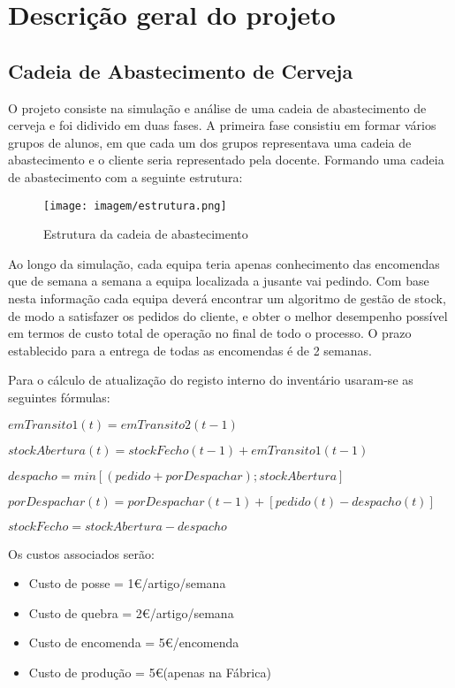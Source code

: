 \chapter{Descrição geral do projeto}
\section{Cadeia de Abastecimento de Cerveja}


O projeto consiste na simulação e análise de uma cadeia de abastecimento de cerveja e foi didivido em duas fases. A primeira fase consistiu em formar vários grupos de alunos, em que cada um dos grupos representava uma cadeia de abastecimento e o cliente seria representado pela docente. Formando uma cadeia de abastecimento com a seguinte estrutura: 

\begin{figure}[tbph]
	\centering
	\texttt{[image: imagem/estrutura.png]}
	\caption{Estrutura da cadeia de abastecimento}
	\label{fig:cominicacaoservidorcliente}
\end{figure}

Ao longo da simulação, cada equipa teria apenas conhecimento das encomendas que de semana a semana a equipa localizada a jusante vai pedindo. Com base nesta informação cada equipa deverá encontrar um algoritmo de gestão de stock, de modo a satisfazer os pedidos do cliente, e obter o melhor desempenho possível em termos de custo total de operação no final de todo o processo. O prazo establecido para a entrega de todas as encomendas é de 2 semanas. 

Para o cálculo de atualização do registo interno do inventário usaram-se as seguintes fórmulas: 

$emTransito1(t) = emTransito2(t-1)$

$stockAbertura (t) = stockFecho(t-1) + emTransito1(t-1)$

$despacho = min [(pedido + porDespachar); stockAbertura]$

$porDespachar(t) = porDespachar(t -1) + [pedido(t) - despacho(t)]$

$stockFecho = stockAbertura - despacho $
\vspace{1cm}

Os custos associados serão: 
\begin{itemize}
	\item Custo de posse = 1\euro/artigo/semana
	\item Custo de quebra = 2\euro/artigo/semana 
	\item Custo de encomenda = 5\euro/encomenda 
	\item Custo de produção = 5\euro   (apenas na Fábrica)
\end{itemize}



